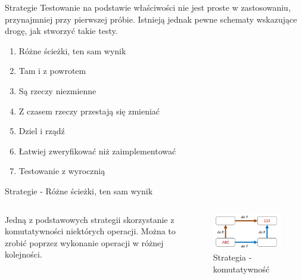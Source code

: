 \begin{frame}{Strategie}
    Testowanie na podstawie właściwości nie jest proste w zastosowaniu, przynajmniej przy pierwszej próbie.
    Istnieją jednak pewne schematy wskazujące drogę, jak stworzyć takie testy.
    \begin{enumerate}[<+->]
        \item Różne ścieżki, ten sam wynik
        \item Tam i z powrotem
        \item Są rzeczy niezmienne
        \item Z czasem rzeczy przestają się zmieniać
        \item Dziel i rządź
        \item Łatwiej zweryfikować niż zaimplementować
        \item Testowanie z wyrocznią
    \end{enumerate}
\end{frame}

\begin{frame}{Strategie - Różne ścieżki, ten sam wynik}
    \begin{columns}[t]
            Jedną z podstawowych strategii skorzystanie z komutatywności niektórych operacji. Można to zrobić poprzez wykonanie operacji w różnej kolejności.\\
        \centering
        \begin{figure}
            \centering
            \includegraphics[width=1\textwidth]{images/property_commutative.png}
            \caption{Strategia - komutatywność}
            \label{fig:commutative_strategy}
        \end{figure}    
    \end{columns}
\end{frame}

